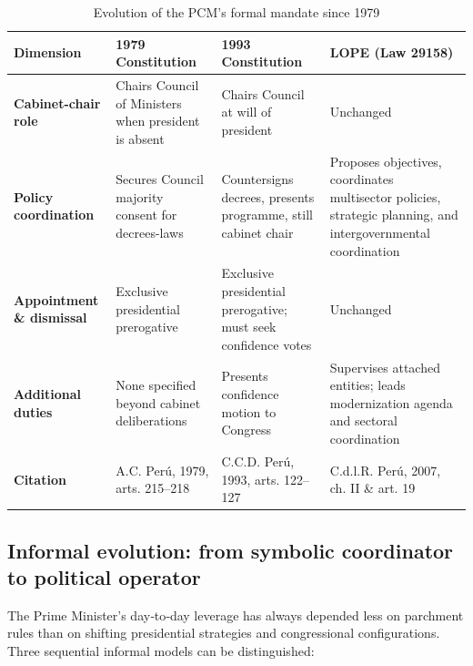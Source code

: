\documentclass[a4paper, 12pt]{article}
\begin{document}
\begin{table}[htbp]
\caption{Evolution of the PCM’s formal mandate since 1979}
\small %
\begin{tabularx}{\textwidth}{lXXX}
\toprule
\textbf{Dimension} &
\textbf{1979 Constitution} &
\textbf{1993 Constitution} &
\textbf{LOPE (Law 29158)} \\
\midrule
\textbf{Cabinet-chair role} &
Chairs Council of Ministers when president is absent &
Chairs Council at will of president &
Unchanged \\
\textbf{Policy coordination} &
Secures Council majority consent for decrees-laws &
Countersigns decrees, presents programme, still cabinet chair &
Proposes objectives, coordinates multisector policies, strategic planning, and intergovernmental coordination \\
\textbf{Appointment \& dismissal} &
Exclusive presidential prerogative &
Exclusive presidential prerogative; must seek confidence votes &
Unchanged \\
\textbf{Additional duties} &
None specified beyond cabinet deliberations &
Presents confidence motion to Congress &
Supervises attached entities; leads modernization agenda and sectoral coordination \\
\textbf{Citation} &
A.C. Perú, 1979, arts. 215–218 &
C.C.D. Perú, 1993, arts. 122–127 &
C.d.l.R. Perú, 2007, ch. II \& art. 19 \\
\bottomrule
\end{tabularx}
\label{tab:pcm-mandate}
\end{table}



\subsection{Informal evolution: from symbolic coordinator to political operator}

The Prime Minister’s day‑to‑day leverage has always depended less on parchment rules than on shifting presidential strategies and congressional configurations.  Three sequential informal models can be distinguished:
\end{document}
